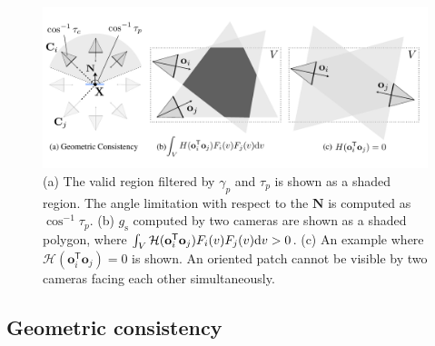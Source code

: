 \begin{figure}[t]
	\includegraphics[width=1\columnwidth]{figures/NormalConstraint}
	\caption{(a) The valid region filtered by  $\gamma_p$ and $\tau_p$ is shown as a shaded region. The angle limitation with respect to the $\mathbf{N}$ is computed as $\cos^{-1}{\tau_p}$. (b) 
		$g_\textrm{s}$ computed by two cameras are shown as a shaded polygon, where $\int_V \mathcal{H} (\mathbf{o}_i^{\mathsf{T}} \mathbf{o}_j) F_i(v) F_j(v) {\textrm d}v >0$. (c) An example where $\mathcal{H} (\mathbf{o}_i^{\mathsf{T}} \mathbf{o}_j)=0$ is shown. An oriented patch cannot be visible by two cameras facing each other simultaneously.}
	\label{fig:PatchRelationMRF}
\end{figure}



\subsection{Geometric consistency} \label{sub:Normal-cue}

